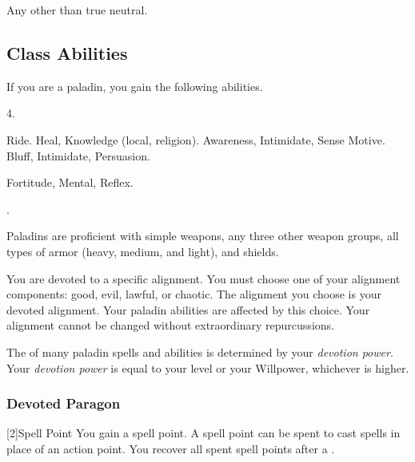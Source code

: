      Any other than true neutral.

    \subsection{Class Abilities}
        If you are a paladin, you gain the following abilities.

         4.

         Ride.
         Heal, Knowledge (local, religion).
         Awareness, Intimidate, Sense Motive.
         Bluff, Intimidate, Persuasion.

          Fortitude,  Mental,  Reflex.

         .

        Paladins are proficient with simple weapons, any three other weapon groups, all types of armor (heavy, medium, and light), and shields.

        You are devoted to a specific alignment.
        You must choose one of your alignment components: good, evil, lawful, or chaotic.
        The alignment you choose is your devoted alignment.
        Your paladin abilities are affected by this choice.
        Your alignment cannot be changed without extraordinary repurcussions.

        The  of many paladin spells and abilities is determined by your \textit{devotion power}.
        Your \textit{devotion power} is equal to your level or your Willpower, whichever is higher.

        \subsubsection{Devoted Paragon}

            [2]{Spell Point}
            You gain a spell point.
            A spell point can be spent to cast spells in place of an action point.
            You recover all spent spell points after a .

